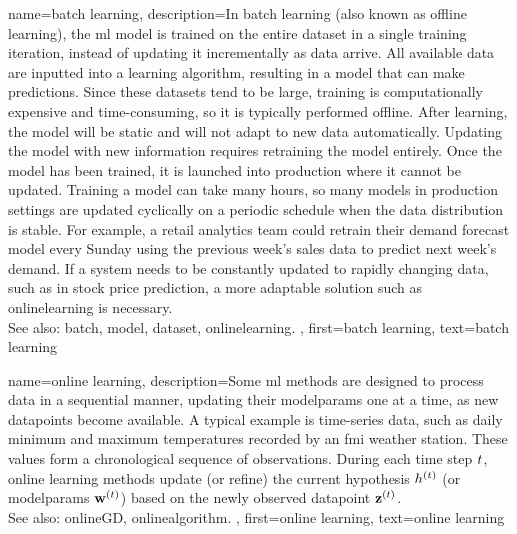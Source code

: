 {name={batch learning},
	description={In \gls{batch} learning (also known as offline learning), the \gls{ml} \gls{model} 
		is trained on the entire \gls{dataset} in a single training iteration, instead of updating it incrementally as \gls{data} arrive. 
		All available \gls{data} are inputted into a learning \gls{algorithm}, resulting in a \gls{model} that can make \glspl{prediction}. 
		Since these \glspl{dataset} tend to be large, training is computationally expensive and time-consuming, 
		so it is typically performed offline. After learning, the \gls{model} will be static and will not adapt to new \gls{data} automatically. 
		Updating the \gls{model} with new information requires retraining the \gls{model} entirely. Once the \gls{model} has been trained, 
		it is launched into production where it cannot be updated. Training a \gls{model} can take many hours, so many \glspl{model} in production 
		settings are updated cyclically on a periodic schedule when the \gls{data} distribution is stable. For example, a retail analytics team 
		could retrain their demand forecast \gls{model} every Sunday using the previous week's sales \gls{data} to predict next week's demand. 
		If a system needs to be constantly updated to rapidly changing \gls{data}, such as in stock price \gls{prediction}, a more adaptable solution 
		such as \gls{onlinelearning} is necessary.
		\\
		See also: \gls{batch}, \gls{model}, \gls{dataset}, \gls{onlinelearning}. },
	first={batch learning}, 
	text={batch learning}
}

{name={online learning},
	description={Some \gls{ml} methods  are designed to process \gls{data} in a sequential 
		manner, updating their \glspl{modelparam} one at a time, as new \glspl{datapoint} become available. 
		A typical example is time-series \gls{data}, such as daily \gls{minimum} and \gls{maximum} temperatures 
		recorded by an \gls{fmi} weather station. These values form a chronological sequence 
		of observations. During each time step $t$, online learning methods update (or refine)  
		the current \gls{hypothesis} $h^{(t)}$ (or \glspl{modelparam} ${\bf w}^{(t)}$) 
		based on the newly observed \gls{datapoint} ${\bf z}^{(t)}$. 
		\\ 
		See also: \gls{onlineGD}, \gls{onlinealgorithm}. },
	first={online learning},
	text={online learning} 
}

